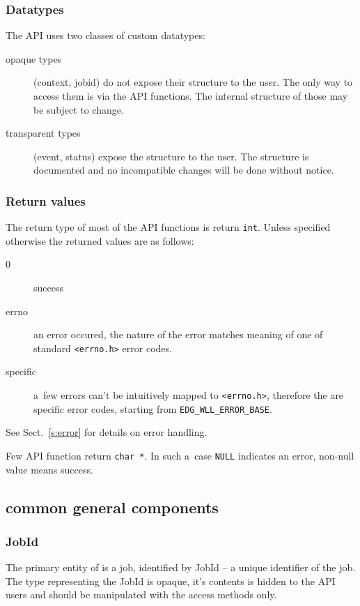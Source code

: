 \subsubsection{Datatypes}
The API uses two classes of custom datatypes:
\begin{description}
\item[opaque types] (\eg context, jobid) do not expose their structure
to the user.
The only way to access them is via the API functions.
The internal structure of those may be subject to change.

\item[transparent types] (\eg event, status) expose the structure to the
user. The structure is documented and no incompatible changes will be done
without notice.
\end{description}

\subsubsection{Return values}
The return type of most of the API functions is return \verb'int'.
Unless specified otherwise the returned values are as follows:
\begin{description}
\item[0] success
\item[errno] an error occured, the nature of the error
matches meaning of one of standard \verb'<errno.h>' error codes.
\item[\LB specific] a~few errors can't be intuitively mapped to
\verb'<errno.h>', therefore the are specific \LB error codes, starting from \verb'EDG_WLL_ERROR_BASE'.
\end{description}
See Sect.~\ref{s:error} for details on error handling.

Few API function return \verb'char *'. In such a~case \verb'NULL' indicates
an error, non-null value means success.

\subsection{\LB common general components}

\subsubsection{JobId} 
The primary entity of \LB is a job, identified by JobId -- a unique
identifier of the job. The type representing the JobId is opaque, it's
contents is hidden to the API users and should be manipulated with the
access methods only. 

